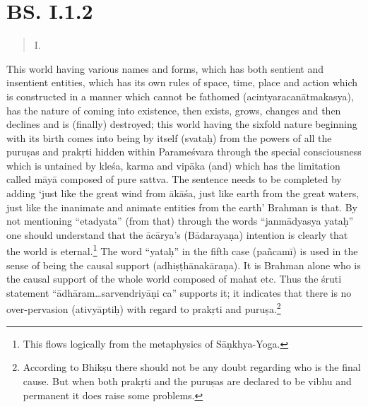 \section*{BS. I.1.2}

\begin{verse}
 I.
\end{verse}


This world having various names and forms, which has both sentient and insentient entities, which has its own rules of space, time, place and action which is constructed in a manner which cannot be fathomed (acintyaracanātmakasya), has the nature of coming into existence, then exists, grows, changes and then declines and is (finally) destroyed; this world having the sixfold nature beginning with its birth comes into being by itself (svataḥ) from the powers of all the puruṣas and prakṛti hidden within Parameśvara through the special consciousness which is untained by kleśa, karma and vipāka (and) which has the limitation called māyā composed of pure sattva. The sentence needs to be completed by adding ‘just like the great wind from ākāśa, just like earth from the great waters, just like the inanimate and animate entities from the earth’ Brahman is that. By not mentioning “etadyata” (from that) through the words “janmādyasya yataḥ” one should understand that the ācārya’s (Bādarayaṇa) intention is clearly that the world is eternal.\footnote{This flows logically from the metaphysics of Sāṇkhya-Yoga.}  The word “yataḥ” in the fifth case (pañcamī) is used in the sense of being the causal support (adhiṣṭhānakāraṇa). It is Brahman alone who is the causal support of the whole world composed of mahat etc. Thus the śruti statement “ādhāram…sarvendriyāṇi ca” supports it; it indicates that there is no over-pervasion (ativyāptiḥ) with regard to prakṛti and puruṣa.\footnote{According to Bhikṣu there should not be any doubt regarding who is the final cause. But when both prakṛti and the puruṣas are declared to be vibhu and permanent it does raise some problems.} 

